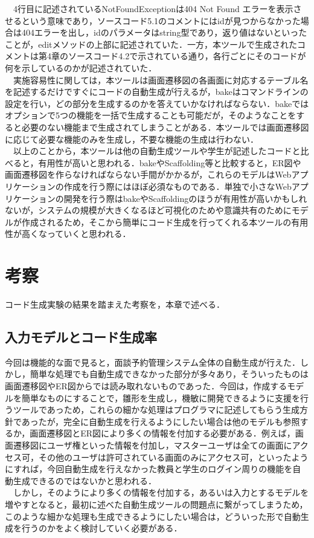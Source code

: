\documentclass{funthesis}
\begin{document}
　4行目に記述されているNotFoundExceptionは404 Not Found エラーを表示させるという意味であり，ソースコード5.1のコメントにはidが見つからなかった場合は404エラーを出し，idのパラメータはstring型であり，返り値はないといったことが，editメソッドの上部に記述されていた．一方，本ツールで生成されたコメントは第4章のソースコード4.2で示されている通り，各行ごとにそのコードが何を示しているのかが記述されていた．\\
　実施容易性に関しては，本ツールは画面遷移図の各画面に対応するテーブル名を記述するだけですぐにコードの自動生成が行えるが，bakeはコマンドラインの設定を行い，どの部分を生成するのかを答えていかなければならない．bakeではオプションで5つの機能を一括で生成することも可能だが，そのようなことをすると必要のない機能まで生成されてしまうことがある．本ツールでは画面遷移図に応じて必要な機能のみを生成し，不要な機能の生成は行わない．\\
　以上のことから，本ツールは他の自動生成ツールや学生が記述したコードと比べると，有用性が高いと思われる．bakeやScaffolding等と比較すると，ER図や画面遷移図を作らなければならない手間がかかるが，これらのモデルはWebアプリケーションの作成を行う際にはほぼ必須なものである．単独で小さなWebアプリケーションの開発を行う際はbakeやScaffoldingのほうが有用性が高いかもしれないが，システムの規模が大きくなるほど可視化のためや意識共有のためにモデルが作成されるため，そこから簡単にコード生成を行ってくれる本ツールの有用性が高くなっていくと思われる．

\chapter{考察}
コード生成実験の結果を踏まえた考察を，本章で述べる．

\section{入力モデルとコード生成率}
今回は機能的な面で見ると，面談予約管理システム全体の自動生成が行えた．しかし，簡単な処理でも自動生成できなかった部分が多々あり，そういったものは画面遷移図やER図からでは読み取れないものであった．今回は，作成するモデルを簡単なものにすることで，雛形を生成し，機敏に開発できるように支援を行うツールであっため，これらの細かな処理はプログラマに記述してもらう生成方針であったが，完全に自動生成を行えるようにしたい場合は他のモデルも参照するか，画面遷移図とER図により多くの情報を付加する必要がある．例えば，画面遷移図にユーザ権といった情報を付加し，マスターユーザは全ての画面にアクセス可，その他のユーザは許可されている画面のみにアクセス可，といったようにすれば，今回自動生成を行えなかった教員と学生のログイン周りの機能を自動生成できるのではないかと思われる．\\
　しかし，そのようにより多くの情報を付加する，あるいは入力とするモデルを増やすとなると，最初に述べた自動生成ツールの問題点に繋がってしまうため，このような細かな処理も生成できるようにしたい場合は，どういった形で自動生成を行うのかをよく検討していく必要がある．
\end{document}
